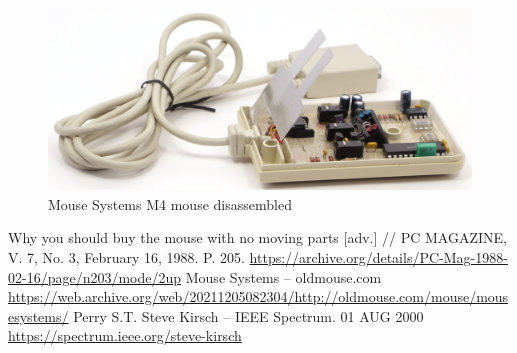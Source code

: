 \documentclass[11pt, a4paper]{article}
\begin{document}
\begin{figure}[h]
    \centering
    \includegraphics[scale=0.6]{1988_mouse_systems_m4/inside_30.jpg}
    \caption{Mouse Systems M4 mouse disassembled}
    \label{fig:mscM4Inside}
\end{figure}

\begin{thebibliography}{9}
 Why you should buy the mouse with no moving parts [adv.] // PC MAGAZINE, V. 7, No. 3, February 16, 1988. P. 205. \url{https://archive.org/details/PC-Mag-1988-02-16/page/n203/mode/2up}
 Mouse Systems -- oldmouse.com  \url{https://web.archive.org/web/20211205082304/http://oldmouse.com/mouse/mousesystems/}
 Perry S.T. Steve Kirsch -- IEEE Spectrum. 01 AUG 2000 \url{https://spectrum.ieee.org/steve-kirsch}
\end{thebibliography}
\end{document}
